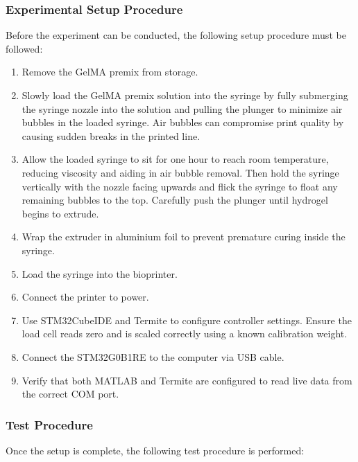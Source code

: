 \subsubsection*{Experimental Setup Procedure}

Before the experiment can be conducted, the following setup procedure must be followed:

\begin{enumerate}
    \item Remove the GelMA premix from storage.
    \item Slowly load the GelMA premix solution into the syringe by fully submerging the syringe nozzle into the solution and pulling the plunger to minimize air bubbles in the loaded syringe. Air bubbles can compromise print quality by causing sudden breaks in the printed line.
    \item Allow the loaded syringe to sit for one hour to reach room temperature, reducing viscosity and aiding in air bubble removal. Then hold the syringe vertically with the nozzle facing upwards and flick the syringe to float any remaining bubbles to the top. Carefully push the plunger until hydrogel begins to extrude.
    \item Wrap the extruder in aluminium foil to prevent premature curing inside the syringe.
    \item Load the syringe into the bioprinter.
    \item Connect the printer to power.
    \item Use STM32CubeIDE and Termite to configure controller settings. Ensure the load cell reads zero and is scaled correctly using a known calibration weight.
    \item Connect the STM32G0B1RE to the computer via USB cable.
    \item Verify that both MATLAB and Termite are configured to read live data from the correct COM port.
\end{enumerate}

\subsubsection*{Test Procedure}

Once the setup is complete, the following test procedure is performed:

